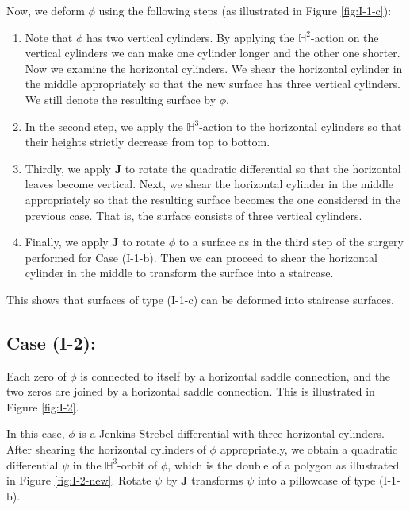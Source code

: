 \documentclass[11pt]{amsart}
\theoremstyle{plain}
\newcommand{\HP}{\mathbb{H}}
\newcommand{\rot}{\mathbf{J}}
\begin{document}
Now, we deform $\phi$ using the following steps (as illustrated in Figure \ref{fig:I-1-c}): 



\begin{enumerate}
  \item[(i)] Note that $\phi$ has two vertical cylinders.
  By applying the $\mathbb{H}^2$-action on the vertical cylinders we can make one cylinder longer and the other one shorter. Now we examine  the horizontal cylinders. 
  We shear the horizontal cylinder in the middle appropriately so
that the new surface has three vertical cylinders. We still denote the resulting surface by $\phi$.
\item[(ii)] In the second step, we apply the $\HP^3$-action to the horizontal cylinders so that their heights strictly decrease  from top to bottom.
    \item[(iii)] Thirdly, we apply $\rot$ to rotate the quadratic differential so that the horizontal leaves become vertical. Next,
 we shear the horizontal cylinder in the middle  appropriately so that the  resulting surface becomes the one considered in the previous case. That is, the surface consists of three vertical cylinders.  
\item[(iv)] Finally, we apply $\rot$ to rotate $\phi$ to a surface as in the third step of the surgery performed for Case (I-1-b). Then we can proceed to shear the horizontal cylinder in the middle  to transform the surface into a staircase.
\end{enumerate} 



This shows that surfaces of type (I-1-c) can be deformed into staircase surfaces. 

\subsection*{Case (I-2):} Each zero of $\phi$ is connected to itself by a horizontal saddle connection, and the two zeros are joined by a horizontal saddle connection. 
This is illustrated in Figure \ref{fig:I-2}.


In this case, $\phi$ is a Jenkins-Strebel differential with three horizontal cylinders. After shearing the horizontal cylinders of $\phi$ appropriately, we obtain a quadratic differential $\psi$ in the $\mathbb{H}^3$-orbit of $\phi$, which is the double of a polygon as illustrated  in Figure \ref{fig:I-2-new}. Rotate $\psi$  by $\rot$ transforms $\psi$ into a pillowcase of type (I-1-b). 
\end{document}

